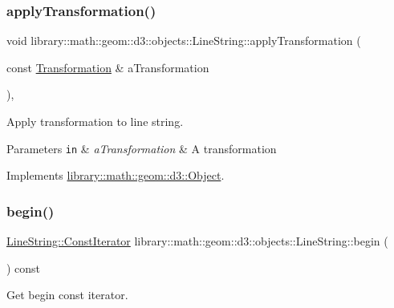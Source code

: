 \subsubsection{\texorpdfstring{apply\+Transformation()}{applyTransformation()}}
{\footnotesize\ttfamily void library\+::math\+::geom\+::d3\+::objects\+::\+Line\+String\+::apply\+Transformation (\begin{DoxyParamCaption}\item[{const \hyperlink{classlibrary_1_1math_1_1geom_1_1d3_1_1_transformation}{Transformation} \&}]{a\+Transformation }\end{DoxyParamCaption})\hspace{0.3cm}{\ttfamily [override]}, {\ttfamily [virtual]}}



Apply transformation to line string. 


\begin{DoxyParams}[1]{Parameters}
\mbox{\tt in}  & {\em a\+Transformation} & A transformation \\
\hline
\end{DoxyParams}


Implements \hyperlink{classlibrary_1_1math_1_1geom_1_1d3_1_1_object_a5fc47b1ee5d9a28efc6010d3d1512470}{library\+::math\+::geom\+::d3\+::\+Object}.

\mbox{\label{classlibrary_1_1math_1_1geom_1_1d3_1_1objects_1_1_line_string_a218630b02ea7a4f32872fd1ee25f3359}} 
\subsubsection{\texorpdfstring{begin()}{begin()}}
{\footnotesize\ttfamily \hyperlink{classlibrary_1_1math_1_1geom_1_1d3_1_1objects_1_1_line_string_a87db0104282f9fcccdc5b1b99e2301e5}{Line\+String\+::\+Const\+Iterator} library\+::math\+::geom\+::d3\+::objects\+::\+Line\+String\+::begin (\begin{DoxyParamCaption}{ }\end{DoxyParamCaption}) const}



Get begin const iterator. 

